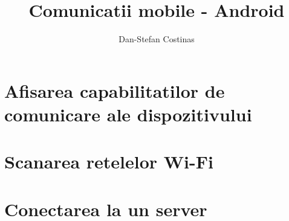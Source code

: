 \documentclass[12pt,a4paper,twoside]{article}
\title{Comunicatii mobile - Android}
\author{Dan-Stefan Costinas}
\begin{document}
\maketitle
\newpage
\tableofcontents


\section{Afisarea capabilitatilor de comunicare ale dispozitivului}
\section{Scanarea retelelor Wi-Fi}
\section{Conectarea la un server}
%
\end{document}
